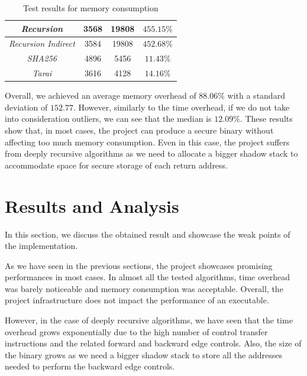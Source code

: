 \begin{table}
\begin{tabular}{|c|c|c|c|}
    \hline
    \textit{Recursion}                   & 3568                         & 19808                        & $455.15\%$               \\
    \hline
    \textit{Recursion Indirect}          & 3584                         & 19808                        & $452.68\%$               \\
    \hline
    \textit{SHA256}                      & 4896                         & 5456                         & $11.43\%$                \\
    \hline
    \textit{Tarai}                       & 3616                         & 4128                         & $14.16\%$                \\
    \hline
  \end{tabular}
  \caption{Test results for memory consumption}
  \label{tab:binsize}
\end{table}

Overall, we achieved an average memory overhead of $88.06\%$ with a standard
deviation of $152.77$. However, similarly to the time overhead, if we do not take
into consideration outliers, we can see that the median is $12.09 \%$. These results
show that, in most cases, the project can produce a secure binary without affecting
too much memory consumption. Even in this case, the project suffers from deeply recursive
algorithms as we need to allocate a bigger shadow stack to accommodate space for
secure storage of each return address.

\section{Results and Analysis}
\label{sec:pa_results}

In this section, we discuss the obtained result and showcase the weak points of the
implementation.

As we have seen in the previous sections, the project showcases promising
performances in most cases. In almost all the tested algorithms, time overhead
was barely noticeable and memory consumption was acceptable. Overall, the
project infrastructure does not impact the performance of an executable.

However, in the case of deeply recursive algorithms, we have seen that the time
overhead grows exponentially due to the high number of control transfer
instructions and the related forward and backward edge controls. Also, the size
of the binary grows as we need a bigger shadow stack to store all the addresses
needed to perform the backward edge controls.

